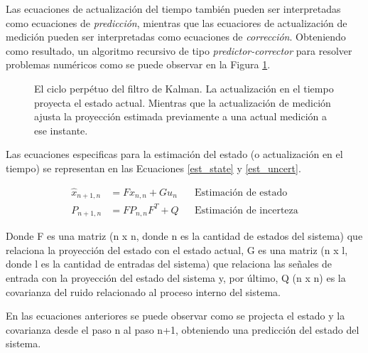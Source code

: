 \documentclass[10pt,a4paper]{article}
\begin{document}
\noindent Las ecuaciones de actualizaci\'on del tiempo tambi\'en pueden ser 
interpretadas como ecuaciones de \emph{predicci\'on}, mientras que las 
ecuaciores de actualizaci\'on de medici\'on pueden ser interpretadas como 
ecuaciones de \emph{correcci\'on}. Obteniendo como resultado, un algoritmo 
recursivo de tipo \emph{predictor-corrector} para resolver problemas num\'ericos 
como se puede observar en la Figura \ref{kalman_filter_sch}.

\begin{figure}[h!]
    \begin{center}
    \caption{El ciclo perp\'etuo del filtro de Kalman. La actualizaci\'on en el
    tiempo proyecta el estado actual. Mientras que la actualizaci\'on de 
    medici\'on ajusta la proyecci\'on estimada previamente a una actual 
    medici\'on a ese instante.}
    \label{kalman_filter_sch}
    \end{center}
\end{figure}

Las ecuaciones especificas para la estimaci\'on del estado (o actualizaci\'on
en el tiempo) se representan en las Ecuaciones \ref{est_state} y 
\ref{est_uncert}.

\begin{align}
    \hat{x}_{n+1, n} &= F\hat{x}_{n,n} + Gu_n & & \textrm{Estimaci\'on de estado}
    \label{est_state} \\
    P_{n+1,n} &= FP_{n,n}F^T + Q & & \textrm{Estimaci\'on de incerteza}
    \label{est_uncert}
\end{align}

\noindent Donde F es una matriz (n x n, donde n es la cantidad de estados del 
sistema) que relaciona la proyecci\'on del estado con el estado actual, G es una 
matriz (n x l, donde l es la cantidad de entradas del sistema) que relaciona las 
señales de entrada con la proyecci\'on del estado del sistema y, por \'ultimo, 
Q (n x n) es la covarianza del ruido relacionado al proceso interno del sistema.

\noindent En las ecuaciones anteriores se puede observar como se projecta el 
estado y la covarianza desde el paso n al paso n+1, obteniendo una predicci\'on 
del estado del sistema.
\end{document}

